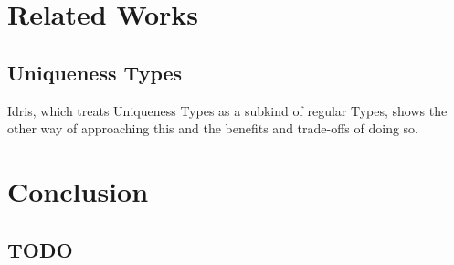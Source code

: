 \documentclass[onehalf,11pt]{beavtex}
\begin{document}





\chapter{Related Works}

\section{Uniqueness Types}

Idris, which treats Uniqueness Types as a subkind of regular Types, shows
the other way of approaching this and the benefits and trade-offs of doing so.



\chapter{Conclusion}
\section{TODO}


{}

\end{document}
